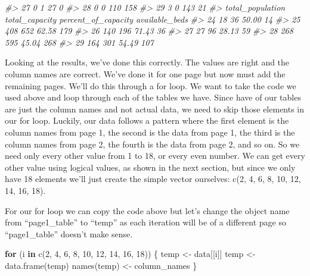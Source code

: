 \documentclass[
]{krantz}
\makeatletter
\newenvironment{Shaded}{\begin{snugshade}}{\end{snugshade}}
\newcommand{\CommentTok}[1]{\textcolor[rgb]{0.37,0.37,0.37}{\textit{#1}}}
\newcommand{\ControlFlowTok}[1]{\textcolor[rgb]{0.27,0.27,0.27}{\textbf{#1}}}
\newcommand{\DecValTok}[1]{\textcolor[rgb]{0.06,0.06,0.06}{#1}}
\newcommand{\FunctionTok}[1]{\textcolor[rgb]{0,0,0}{#1}}
\newcommand{\NormalTok}[1]{#1}
\newcommand{\OtherTok}[1]{\textcolor[rgb]{0.37,0.37,0.37}{#1}}
\newenvironment{kframe}{%
\medskip{}
\setlength{\fboxsep}{.8em}
 \def\at@end@of@kframe{}%
 \ifinner\ifhmode%
  \def\at@end@of@kframe{\end{minipage}}%
  \begin{minipage}{\columnwidth}%
 \fi\fi%
 \def\FrameCommand##1{\hskip\@totalleftmargin \hskip-\fboxsep
 \colorbox{shadecolor}{##1}\hskip-\fboxsep
     \hskip-\linewidth \hskip-\@totalleftmargin \hskip\columnwidth}%
 \MakeFramed {\advance\hsize-\width
   \@totalleftmargin\z@ \linewidth\hsize
   \@setminipage}}%
 {\par\unskip\endMakeFramed%
 \at@end@of@kframe}
\renewenvironment{Shaded}{\begin{kframe}}{\end{kframe}}
\makeatother
\begin{document}
\begin{Shaded}
\begin{Highlighting}[]
\CommentTok{\#\textgreater{} 27                               0            1          27              0}
\CommentTok{\#\textgreater{} 28                               0            0         110            158}
\CommentTok{\#\textgreater{} 29                               3            0         143             21}
\CommentTok{\#\textgreater{}    total\_population total\_capacity percent\_of\_capacity available\_beds}
\CommentTok{\#\textgreater{} 24               18             36               50.00             14}
\CommentTok{\#\textgreater{} 25              408            652               62.58            179}
\CommentTok{\#\textgreater{} 26              140            196               71.43             36}
\CommentTok{\#\textgreater{} 27               27             96               28.13             59}
\CommentTok{\#\textgreater{} 28              268            595               45.04            268}
\CommentTok{\#\textgreater{} 29              164            301               54.49            107}
\end{Highlighting}
\end{Shaded}

Looking at the results, we've done this correctly. The values are right and the column names are correct. We've done it for one page but now must add the remaining pages. We'll do this through a for loop. We want to take the code we used above and loop through each of the tables we have. Since have of our tables are just the column names and not actual data, we need to skip those elements in our for loop. Luckily, our data follows a pattern where the first element is the column names from page 1, the second is the data from page 1, the third is the column names from page 2, the fourth is the data from page 2, and so on. So we need only every other value from 1 to 18, or every even number. We can get every other value using logical values, as shown in the next section, but since we only have 18 elements we'll just create the simple vector ourselves: c(2, 4, 6, 8, 10, 12, 14, 16, 18).

For our for loop we can copy the code above but let's change the object name from ``page1\_table'' to ``temp'' as each iteration will be of a different page so ``page1\_table'' doesn't make sense.

\begin{Shaded}
\begin{Highlighting}[]
\ControlFlowTok{for}\NormalTok{ (i }\ControlFlowTok{in} \FunctionTok{c}\NormalTok{(}\DecValTok{2}\NormalTok{, }\DecValTok{4}\NormalTok{, }\DecValTok{6}\NormalTok{, }\DecValTok{8}\NormalTok{, }\DecValTok{10}\NormalTok{, }\DecValTok{12}\NormalTok{, }\DecValTok{14}\NormalTok{, }\DecValTok{16}\NormalTok{, }\DecValTok{18}\NormalTok{)) \{}
\NormalTok{  temp        }\OtherTok{\textless{}{-}}\NormalTok{ data[[i]]}
\NormalTok{  temp        }\OtherTok{\textless{}{-}} \FunctionTok{data.frame}\NormalTok{(temp)}
  \FunctionTok{names}\NormalTok{(temp) }\OtherTok{\textless{}{-}}\NormalTok{ column\_names}
\NormalTok{\}}
\end{Highlighting}
\end{Shaded}
\end{document}
